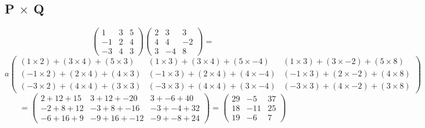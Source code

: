 \documentclass[a4paper,12pt]{article}
\begin{document}
    \subsection{P $\times$ Q}
      \begin{equation}
        \begin{pmatrix}
          1 & 3 & 5\\
          -1 & 2 & 4\\
          -3 & 4 & 3
        \end{pmatrix}
        \begin{pmatrix}
          2 & 3 & 3\\
          4 & 4 & -2\\
          3 & -4 & 8
        \end{pmatrix}
        =
      \end{equation}
      \begin{equation}a
        \begin{pmatrix}
          ( 1 \times 2) + (3 \times 4) + (5 \times 3) & ( 1 \times 3) + (3 \times 4) + (5 \times -4) & ( 1 \times 3) + (3 \times -2) + (5 \times 8)\\
          (-1 \times 2) + (2 \times 4) + (4 \times 3) & (-1 \times 3) + (2 \times 4) + (4 \times -4) & (-1 \times 3) + (2 \times -2) + (4 \times 8)\\
          (-3 \times 2) + (4 \times 4) + (3 \times 3) & (-3 \times 3) + (4 \times 4) + (3 \times -4) & (-3 \times 3) + (4 \times -2) + (3 \times 8)
        \end{pmatrix}
      \end{equation}
      \begin{equation}
        =
        \begin{pmatrix}
          2 + 12 + 15 & 3 + 12 + -20 & 3 + -6 + 40\\
          -2 + 8 + 12 & -3 + 8 + -16 & -3 + -4 + 32\\
          -6 + 16 + 9 & -9 + 16 + -12 & -9 + -8 + 24
        \end{pmatrix}
        =
        \begin{pmatrix}
          29 & -5 & 37\\
          18 & -11 & 25\\
          19 & -6 & 7
        \end{pmatrix}
      \end{equation}

      \newpage
\end{document}
